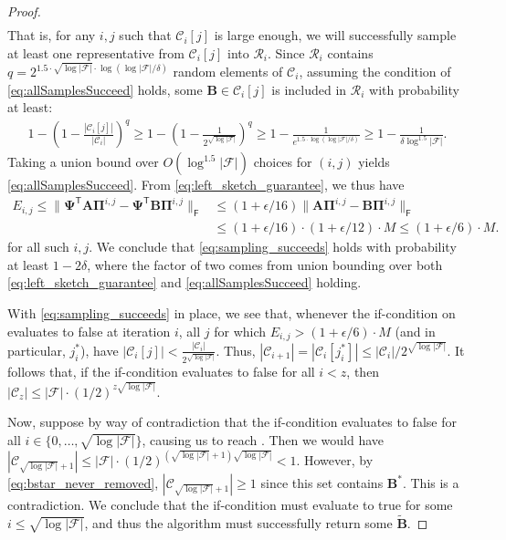 \documentclass{article}[11pt]
\theoremstyle{definition}
\newcommand{\bv}[1]{\boldsymbol{\mathbf{#1}}}
\newcommand{\T}{\mathsf{T}}
\newcommand{\Fro}{\mathsf{F}}
\newcommand{\F}{\mathcal{F}}
\begin{document}
\begin{proof}
\begin{align}
     \end{align}
     That is, for any $i,j$ such that $\mathcal{C}_{i}[j]$ is large enough, we will successfully sample at least one representative from $\mathcal{C}_{i}[j]$ into $\mathcal{R}_{i}$. Since $\mathcal{R}_i$ contains $q = 2^{1.5 \cdot \sqrt{\log|\F|}\cdot \log(\log|\F|/\delta)}$ random elements of $\mathcal C_i$, assuming the condition of \eqref{eq:allSamplesSucceed} holds, some $\bv{B}\in \mathcal{C}_{i}[j]$ is included in $\mathcal{R}_{i}$ with probability at least:
       \begin{align*}
       1 - \left(1 - \frac{|\mathcal{C}_{i}[j]|}{|\mathcal{C}_{i}|}\right)^{q} \geq 1- \left(1 - \frac{1}{2^{\sqrt{\log|\F|}}}\right)^{q} \geq 1 - \frac{1}{e^{1.5 \cdot \log(\log|\F|/\delta)}} \geq 1- \frac{1}{\delta \log^{1.5}|\F|}. 
       \end{align*}
       Taking a union bound over  $O(\log^{1.5}|\F|)$ choices for $(i,j)$ yields \eqref{eq:allSamplesSucceed}. From \eqref{eq:left_sketch_guarantee}, we thus have
       \begin{align*}
       E_{i,j}
       \leq \|\bv{\Psi}^\T\bv{A}\bv{\Pi}^{i,j} - \bv{\Psi}^\T\bv{B}\bv{\Pi}^{i,j}\|_\Fro &\leq (1+\epsilon/16)\|\bv{A}\bv{\Pi}^{i,j} - \bv{B}\bv{\Pi}^{i,j}\|_\Fro \\ &\leq (1+\epsilon/16)\cdot (1+\epsilon/12)\cdot M \leq (1+\epsilon/6)\cdot M.
       \end{align*}
       for all such $i,j$.
       We conclude that \eqref{eq:sampling_succeeds} holds with probability at least $1-2\delta$, where the factor of two comes from union bounding over both \eqref{eq:left_sketch_guarantee}  and \eqref{eq:allSamplesSucceed}   holding.

       With \eqref{eq:sampling_succeeds} in place, we see that, whenever the if-condition on  
       evaluates to false at iteration $i$, all $j$ for which $E_{i,j} > (1+\epsilon/6)\cdot M$ (and in particular, $j_i^*$), have $|\mathcal{C}_{i}[j]| < \frac{|\mathcal{C}_{i}|}{2^{\sqrt{\log|\F|}}}$. Thus, $|\mathcal C_{i+1}| = |\mathcal C_i[j_i^*]| \le |\mathcal{C}_{i}|/2^{\sqrt{\log|\F|}}$.
       It follows that, if the if-condition evaluates to false for all $i < z$, then $|\mathcal{C}_{z}| \leq |\F|\cdot (1/2)^{z\sqrt{\log|\F|}}$. 

       Now, suppose by way of contradiction that the if-condition evaluates to false for all $i \in \{0, \ldots, \sqrt{\log|\F|}\}$, causing us to reach . 
       Then we would have $\left|\mathcal{C}_{\sqrt{\log|\F|} + 1}\right| \leq |\F|\cdot (1/2)^{\left(\sqrt{\log|\F|} + 1\right)\sqrt{\log|\F|}} < 1$. 
       However, by \eqref{eq:bstar_never_removed}, $\left|\mathcal{C}_{\sqrt{\log|\F|} + 1}\right| \geq 1$ since this set contains $\bv{B}^*$. This is a contradiction. We conclude that the if-condition must evaluate to true for some $i \leq \sqrt{\log|\F|}$, and thus the algorithm must successfully return some $\bv {\tilde B}$.


\end{proof}
\end{document}
